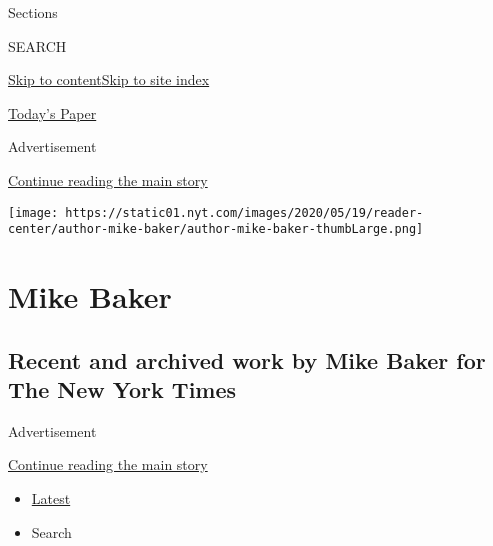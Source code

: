 Sections

SEARCH

\protect\hyperlink{site-content}{Skip to
content}\protect\hyperlink{site-index}{Skip to site index}

\href{https://myaccount.nytimes.com/auth/login?response_type=cookie\&client_id=vi}{}

\href{https://www.nytimes.com/section/todayspaper}{Today's Paper}

Advertisement

\protect\hyperlink{after-top}{Continue reading the main story}

\texttt{[image: https://static01.nyt.com/images/2020/05/19/reader-center/author-mike-baker/author-mike-baker-thumbLarge.png]}

\hypertarget{mike-baker}{%
\section{Mike Baker}\label{mike-baker}}

\hypertarget{recent-and-archived-work-by-mike-baker-for-the-new-york-times}{%
\subsection{Recent and archived work by Mike Baker for The New York
Times}\label{recent-and-archived-work-by-mike-baker-for-the-new-york-times}}

Advertisement

\protect\hyperlink{after-mid1}{Continue reading the main story}

\begin{itemize}
\tightlist
\item
  \protect\hyperlink{stream-panel}{Latest}
\item
  Search
\end{itemize}

